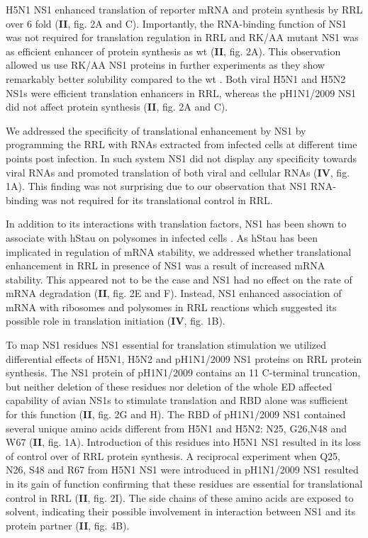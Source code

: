 		H5N1 NS1 enhanced translation of reporter mRNA and protein synthesis by \gls{RRL} over 6 fold (\textbf{II}, fig. 2A and C). Importantly, the RNA-binding function of NS1 was not required for translation regulation in \gls{RRL} and RK/AA mutant NS1 was as efficient enhancer of protein synthesis as \gls{wt} (\textbf{II}, fig. 2A). This observation allowed us use RK/AA NS1 proteins in further experiments as they show remarkably better solubility compared to the \gls{wt} \parencite{Bornholdt2008}. Both viral H5N1 and H5N2 NS1s were efficient translation enhancers in \gls{RRL}, whereas the pH1N1/2009 NS1 did not affect protein synthesis (\textbf{II}, fig. 2A and C). 
		
		We addressed the specificity of translational enhancement by NS1 by programming the \gls{RRL} with RNAs extracted from infected cells at different time points post infection. In such system NS1 did not display any specificity towards viral RNAs and promoted translation of both viral and cellular RNAs (\textbf{IV}, fig. 1A). This finding was not surprising due to our observation that NS1 RNA-binding was not required for its translational control in \gls{RRL}. 
		
		In addition to its interactions with translation factors, NS1 has been shown to associate with \gls{hStau} on polysomes in infected cells \parencite{Falcon1999}. As \gls{hStau} has been implicated in regulation of mRNA stability, we addressed whether translational enhancement in RRL in presence of \gls{NS1} was a result of increased mRNA stability. This appeared not to be the case and NS1 had no effect on the rate of mRNA degradation (\textbf{II}, fig. 2E and F). Instead, NS1 enhanced association of mRNA with ribosomes and polysomes in RRL reactions which suggested its possible role in translation initiation (\textbf{IV}, fig. 1B).
		
		To map NS1 residues NS1 essential for translation stimulation we utilized differential effects of H5N1, H5N2 and pH1N1/2009 NS1 proteins on RRL protein synthesis. The NS1 protein of pH1N1/2009 contains an 11 C-terminal truncation, but neither deletion of these residues nor deletion of the whole ED affected capability of avian NS1s to stimulate translation and  RBD alone was sufficient for this function (\textbf{II}, fig. 2G and H). The RBD of pH1N1/2009 NS1 contained several unique amino acids different from H5N1 and H5N2: N25, G26,N48 and W67 (\textbf{II}, fig. 1A). Introduction of this residues into H5N1 NS1 resulted in its loss of control over of RRL protein synthesis. A reciprocal experiment when Q25, N26, S48 and R67 from H5N1 NS1 were introduced in pH1N1/2009 NS1 resulted in its gain of function confirming that these residues are essential for translational control in RRL (\textbf{II}, fig. 2I). The side chains of these amino acids are exposed to solvent, indicating their possible involvement in interaction between NS1 and its protein partner (\textbf{II}, fig. 4B).
		
